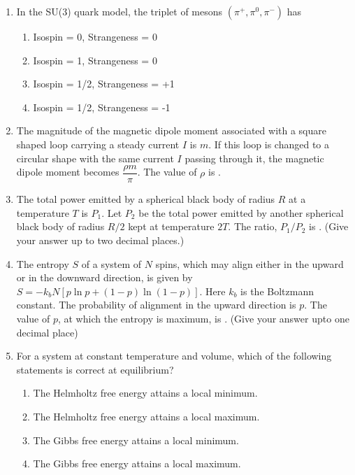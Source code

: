 \documentclass[journal,12pt,onecolumn]{IEEEtran}
\theoremstyle{remark}
\begin{document}
\begin{enumerate}
\item In the SU(3) quark model, the triplet of mesons $(\pi^{+}, \pi^{0}, \pi^{-})$ has
\begin{enumerate}
    \item Isospin = 0, Strangeness = 0
    \item Isospin = 1, Strangeness = 0
    \item Isospin = 1/2, Strangeness = +1
    \item Isospin = 1/2, Strangeness = -1
\end{enumerate}

\item The magnitude of the magnetic dipole moment associated with a square shaped loop carrying a steady current $I$ is $m$. If this loop is changed to a circular shape with the same current $I$ passing through it, the magnetic dipole moment becomes $\dfrac{ \rho m}{\pi}$. The value of $\rho$ is \underline{\hspace{2cm}}.

\item The total power emitted by a spherical black body of radius $R$ at a temperature $T$ is $P_1$. Let $P_2$ be the total power emitted by another spherical black body of radius $R/2$ kept at temperature $2T$. The ratio, $P_1/P_2$ is \underline{\hspace{2cm}}. (Give your answer up to two decimal places.)

\item The entropy $S$ of a system of $N$ spins, which may align either in the upward or in the downward direction, is given by $S = -k_b N [ p \ln p + (1 - p) \ln (1 - p) ]$. Here $k_b$ is the Boltzmann constant. The probability of alignment in the upward direction is $p$. The value of $p$, at which the entropy is maximum, is \underline{\hspace{2cm}}. (Give your answer upto one decimal place)

\item For a system at constant temperature and volume, which of the following statements is correct at equilibrium?


\begin{enumerate}
    \item The Helmholtz free energy attains a local minimum.
    \item The Helmholtz free energy attains a local maximum.
    \item The Gibbs free energy attains a local minimum.
    \item The Gibbs free energy attains a local maximum.
\end{enumerate}



\end{enumerate}
\end{document}
